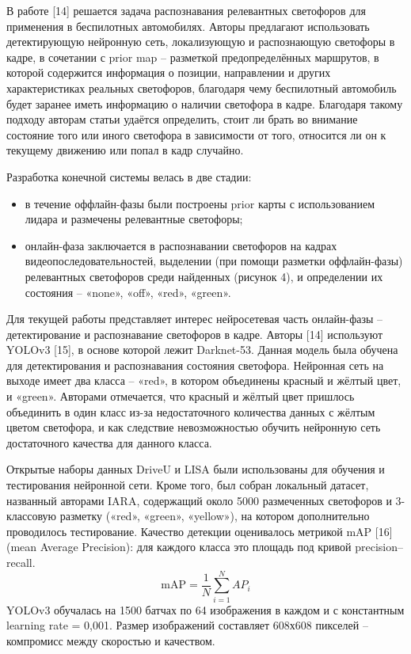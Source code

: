 \documentclass{misisarticle}
\begin{document}
В работе [14] решается задача распознавания релевантных светофоров для применения в беспилотных автомобилях. Авторы предлагают использовать детектирующую нейронную сеть, локализующую и распознающую светофоры в кадре, в сочетании с prior map – разметкой предопределённых маршрутов, в которой содержится информация о позиции, направлении и других характеристиках реальных светофоров, благодаря чему беспилотный автомобиль будет заранее иметь информацию о наличии светофора в кадре. Благодаря такому подходу авторам статьи удаётся определить, стоит ли брать во внимание состояние того или иного светофора в зависимости от того, относится ли он к текущему движению или попал в кадр случайно.

Разработка конечной системы велась в две стадии:

\begin{itemize}
  \item в течение оффлайн-фазы были построены prior карты с использованием лидара и размечены релевантные светофоры;
  \item онлайн-фаза заключается в распознавании светофоров на кадрах видеопоследовательностей, выделении (при помощи разметки оффлайн-фазы) релевантных светофоров среди найденных (рисунок 4), и определении их состояния – «none», «off», «red», «green».
\end{itemize}

Для текущей работы представляет интерес нейросетевая часть онлайн-фазы – детектирование и распознавание светофоров в кадре. Авторы [14] используют YOLOv3 [15], в основе которой лежит Darknet-53. Данная модель была обучена для детектирования и распознавания состояния светофора. Нейронная сеть на выходе имеет два класса – «red», в котором объединены красный и жёлтый цвет, и «green». Авторами отмечается, что красный и жёлтый цвет пришлось объединить в один класс из-за недостаточного количества данных с жёлтым цветом светофора, и как следствие невозможностью обучить нейронную сеть достаточного качества для данного класса.

Открытые наборы данных DriveU и LISA были использованы для обучения и тестирования нейронной сети. Кроме того, был собран локальный датасет, названный авторами IARA, содержащий около 5000 размеченных светофоров и 3-классовую разметку («red», «green», «yellow»), на котором дополнительно проводилось тестирование. Качество детекции оценивалось метрикой mAP [16] (mean Average Precision): для каждого класса это площадь под кривой precision--recall.
\begin{equation}
  \label{eq:map}
  \mathrm{mAP} = \frac{1}{N}\sum_{i=1}^{N} AP_i
\end{equation}
YOLOv3 обучалась на 1500 батчах по 64 изображения в каждом и с константным learning rate = 0{,}001. Размер изображений составляет 608х608 пикселей – компромисс между скоростью и качеством.
\end{document}
